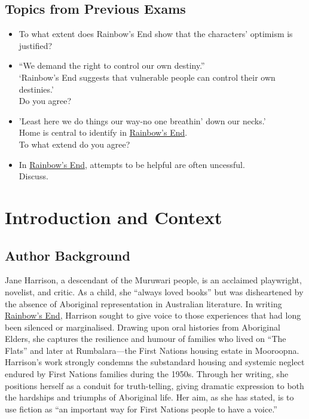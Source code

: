 \documentclass[a4paper]{article}
\begin{document}
\subsection{Topics from Previous Exams}
\begin{itemize}
\item To what extent does Rainbow’s End show that the characters’ optimism is justified? 
\item “We demand the right to control our own destiny.”\\
‘Rainbow’s End suggests that vulnerable people can control their own destinies.’\\
Do you agree?
\item 'Least here we do things our way-no one breathin' down our necks.'\\
Home is central to identify in \underline{Rainbow's End}.\\
To what extend do you agree?
\item In \underline{Rainbow's End}, attempts to be helpful are often uncessful.\\ Discuss.


\end{itemize}
\newpage

\section{Introduction and Context}

\subsection{Author Background}
Jane Harrison, a descendant of the Muruwari people, is an acclaimed playwright, novelist, and critic. As a child, she “always loved books” but was disheartened by the absence of Aboriginal representation in Australian literature. In writing \underline{Rainbow's End}, Harrison sought to give voice to those experiences that had long been silenced or marginalised. Drawing upon oral histories from Aboriginal Elders, she captures the resilience and humour of families who lived on “The Flats” and later at Rumbalara—the First Nations housing estate in Mooroopna.\\

Harrison’s work strongly condemns the substandard housing and systemic neglect endured by First Nations families during the 1950s. Through her writing, she positions herself as a conduit for truth-telling, giving dramatic expression to both the hardships and triumphs of Aboriginal life. Her aim, as she has stated, is to use fiction as “an important way for First Nations people to have a voice.”\\
\end{document}

